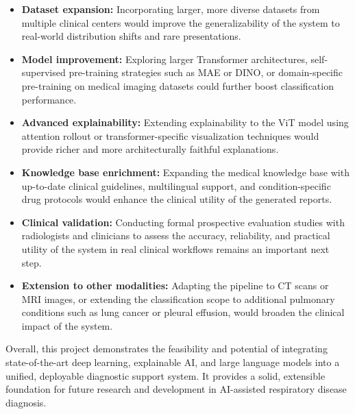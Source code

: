 \documentclass[12pt]{report}
\begin{document}
\begin{itemize}
    \item \textbf{Dataset expansion:} Incorporating larger, more diverse
    datasets from multiple clinical centers would improve the
    generalizability of the system to real-world distribution shifts
    and rare presentations.

    \item \textbf{Model improvement:} Exploring larger Transformer
    architectures, self-supervised pre-training strategies such as
    MAE or DINO, or domain-specific pre-training on medical imaging
    datasets could further boost classification performance.

    \item \textbf{Advanced explainability:} Extending explainability
    to the ViT model using attention rollout or transformer-specific
    visualization techniques would provide richer and more
    architecturally faithful explanations.

    \item \textbf{Knowledge base enrichment:} Expanding the medical
    knowledge base with up-to-date clinical guidelines, multilingual
    support, and condition-specific drug protocols would enhance the
    clinical utility of the generated reports.

    \item \textbf{Clinical validation:} Conducting formal prospective
    evaluation studies with radiologists and clinicians to assess the
    accuracy, reliability, and practical utility of the system in
    real clinical workflows remains an important next step.

    \item \textbf{Extension to other modalities:} Adapting the pipeline
    to CT scans or MRI images, or extending the classification scope
    to additional pulmonary conditions such as lung cancer or pleural
    effusion, would broaden the clinical impact of the system.
\end{itemize}

Overall, this project demonstrates the feasibility and potential of
integrating state-of-the-art deep learning, explainable AI, and
large language models into a unified, deployable diagnostic support
system. It provides a solid, extensible foundation for future research
and development in AI-assisted respiratory disease diagnosis.
\end{document}
